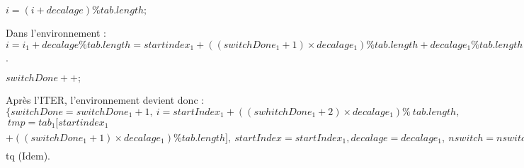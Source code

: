 \begin{center}
  $i = (i+decalage) \% tab.length;$\\
 \end{center} 
 
 Dans l'environnement : $i = i_{1} + decalage \% tab.length = startindex_{1} + ((switchDone_{1}+1)\times decalage_{1}) \% tab.length  + decalage_{1} \%tab.length = startIndex_{1} + ((swhitchDone_{1}+2)\times decalage_{1}) \%tab.length$.\\
 
\begin{center}
 $switchDone++;$\\
\end{center}
 
Après l'ITER, l'environnement devient donc : \\

\noindent$\{switchDone = switchDone_{1}+1,\ i = startIndex_{1} + ((swhitchDone_{1}+2)\times decalage_1) \%\ tab.length,$\\
$\ tmp = tab_{1}[startindex_{1}$ $+ ((switchDone_{1}+1)\times decalage_{1}) \% tab.length],\ startIndex = startIndex_{1}, decalage = decalage_{1},\ nswitch = nswitch_{1},\ tab = tab_{1}[val_{1}^{0},val_{1}^{1}, ..., val_{1}^{(i_{1}-1)}, tmp_{1}, ...,val_{1}^{tab.length-1}]\}$\\
tq (Idem).\\

